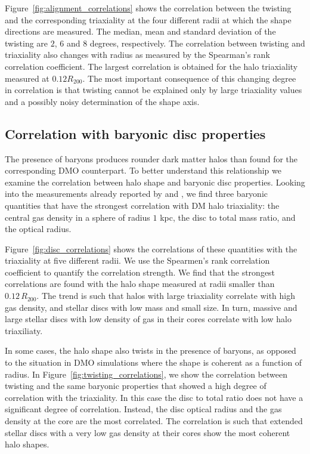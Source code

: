 \documentclass[usenatbib]{mnras}
\begin{document}
Figure~\ref{fig:alignment_correlations} shows the correlation between
the twisting and the corresponding triaxiality at the four different
radii at which the shape directions are measured.
The median, mean and standard deviation of the twisting 
are $2$, $6$ and $8$ degrees, respectively.
The correlation between twisting and triaxiality also changes with
radius as measured by the Spearman's rank correlation coefficient.
The largest correlation is obtained for the halo triaxiality measured at
$0.12R_{200}$. 
The most important consequence of this changing degree in correlation
is that twisting cannot be explained only by large triaxiality values
and a possibly noisy determination of the shape axis.

\subsection{Correlation with baryonic disc properties}

The presence of baryons produces rounder dark matter halos than found for the 
corresponding DMO \textbf{}counterpart. To better understand this relationship we examine the correlation
between halo shape and baryonic disc properties.  
Looking into the measurements already reported by \cite{auriga} and
\cite{Pakmor17}, we find three baryonic quantities that have the
strongest correlation with DM halo triaxiality: the central gas
density in a sphere of radius $1$ kpc, the disc to total mass ratio, and
the optical radius. 

Figure~\ref{fig:disc_correlations} shows the correlations of
these quantities with the triaxiality at five different radii.
We use the Spearmen's rank correlation coefficient to quantify the
correlation strength. We find that the strongest correlations are found with the halo shape
measured at radii smaller than $0.12\, R_{200}$.
The  trend is such that halos with large triaxiality correlate with
high gas density, and stellar discs with low mass and small size. 
In turn, massive and large stellar discs with low density of
gas in their cores correlate with low halo triaxiliaty. 

In some cases, the halo shape also twists in the presence of baryons, as opposed to
the situation in DMO simulations where the shape is coherent as a
function of radius. In Figure~\ref{fig:twisting_correlations}, we show the correlation
between twisting and the same baryonic properties that showed a high
degree of correlation with the triaxiality.
In this case the disc to total ratio does not have a significant
degree of correlation. Instead, the disc optical radius and the gas density
at the core are the most correlated. 
The correlation is such that extended stellar discs with a very low
gas density at their cores show the most coherent halo shapes.  
\end{document}
